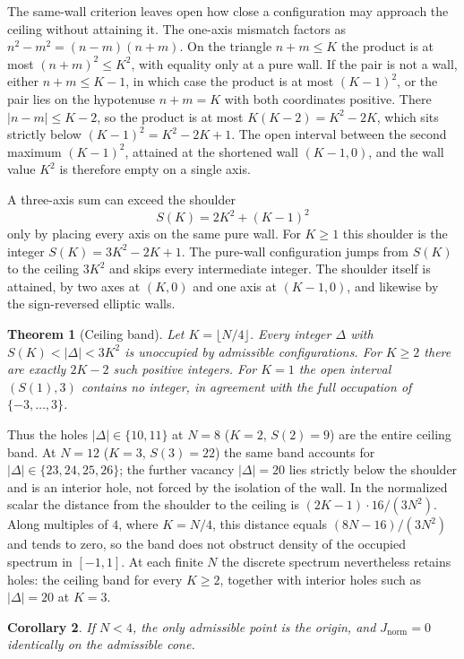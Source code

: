 \documentclass[a4paper]{article}
\newtheorem{theorem}{Theorem}[section]
\newtheorem{corollary}[theorem]{Corollary}
\theoremstyle{definition}
\newcommand{\Jnorm}{J_{\mathrm{norm}}}
\begin{document}
The same-wall criterion leaves open how close a configuration may approach the ceiling without attaining it. The one-axis mismatch factors as $n^2-m^2=(n-m)(n+m)$. On the triangle $n+m\le K$ the product is at most $(n+m)^2\le K^2$, with equality only at a pure wall. If the pair is not a wall, either $n+m\le K-1$, in which case the product is at most $(K-1)^2$, or the pair lies on the hypotenuse $n+m=K$ with both coordinates positive. There $|n-m|\le K-2$, so the product is at most $K(K-2)=K^2-2K$, which sits strictly below $(K-1)^2=K^2-2K+1$. The open interval between the second maximum $(K-1)^2$, attained at the shortened wall $(K-1,0)$, and the wall value $K^2$ is therefore empty on a single axis.

A three-axis sum can exceed the shoulder
\[
S(K)=2K^2+(K-1)^2
\]
only by placing every axis on the same pure wall. For $K\ge 1$ this shoulder is the integer $S(K)=3K^2-2K+1$. The pure-wall configuration jumps from $S(K)$ to the ceiling $3K^2$ and skips every intermediate integer. The shoulder itself is attained, by two axes at $(K,0)$ and one axis at $(K-1,0)$, and likewise by the sign-reversed elliptic walls.

\begin{theorem}[Ceiling band]
\label{thm:ceiling-band}
Let $K=\lfloor N/4\rfloor$. Every integer $\Delta$ with $S(K)<|\Delta|<3K^2$ is unoccupied by admissible configurations. For $K\ge 2$ there are exactly $2K-2$ such positive integers. For $K=1$ the open interval $(S(1),3)$ contains no integer, in agreement with the full occupation of $\{-3,\ldots,3\}$.
\end{theorem}

Thus the holes $|\Delta|\in\{10,11\}$ at $N=8$ ($K=2$, $S(2)=9$) are the entire ceiling band. At $N=12$ ($K=3$, $S(3)=22$) the same band accounts for $|\Delta|\in\{23,24,25,26\}$; the further vacancy $|\Delta|=20$ lies strictly below the shoulder and is an interior hole, not forced by the isolation of the wall. In the normalized scalar the distance from the shoulder to the ceiling is $(2K-1)\cdot 16/(3N^2)$. Along multiples of $4$, where $K=N/4$, this distance equals $(8N-16)/(3N^2)$ and tends to zero, so the band does not obstruct density of the occupied spectrum in $[-1,1]$. At each finite $N$ the discrete spectrum nevertheless retains holes: the ceiling band for every $K\ge 2$, together with interior holes such as $|\Delta|=20$ at $K=3$.

\begin{corollary}
\label{cor:small-N}
If $N<4$, the only admissible point is the origin, and $\Jnorm=0$ identically on the admissible cone.
\end{corollary}
\end{document}

